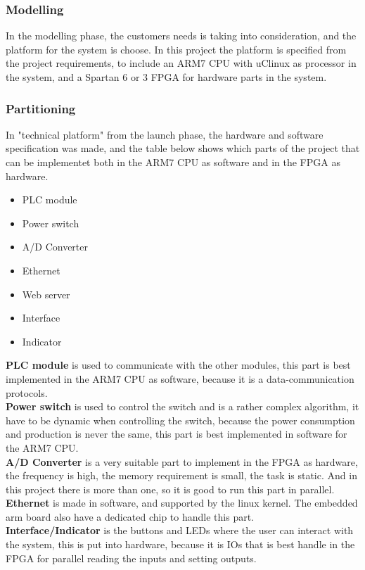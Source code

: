 \subsubsection{Modelling}
In the modelling phase, the customers needs is taking into consideration, and the platform for the system is choose. In this project the platform is specified from the project requirements, to include an ARM7 CPU with uClinux as processor in the system, and a Spartan 6 or 3 FPGA for hardware parts in the system.

\subsubsection{Partitioning}
In "technical platform" from the launch phase, the hardware and software specification was made, and the table below shows which parts of the project that can be implementet both in the ARM7 CPU as software and in the FPGA as hardware.

\begin{itemize}
	\item PLC module
	\item Power switch
	\item A/D Converter
	\item Ethernet
	\item Web server
	\item Interface
	\item Indicator
\end{itemize}
\textbf{PLC module} is used to communicate with the other modules, this part is best implemented in the ARM7 CPU as software, because it is a data-communication protocols.\\
\textbf{Power switch} is used to control the switch and is a rather complex algorithm, it have to be dynamic when controlling the switch, because the power consumption and production is never the same, this part is best implemented in software for the ARM7 CPU.\\
\textbf{A/D Converter} is a very suitable part to implement in the FPGA as hardware, the frequency is high, the memory requirement is small, the task is static. And in this project there is more than one, so it is good to run this part in parallel.\\
\textbf{Ethernet} is made in software, and supported by the linux kernel. The embedded arm board also have a dedicated chip to handle this part.\\
\textbf{Interface/Indicator} is the buttons and LEDs where the user can interact with the system, this is put into hardware, because it is IOs that is best handle in the FPGA for parallel reading the inputs and setting outputs.

